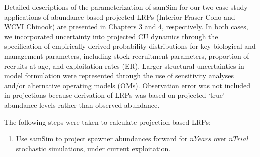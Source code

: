 \documentclass[11pt]{book}
\begin{document}
Detailed descriptions of the parameterization of samSim for our two case study applications of abundance-based projected LRPs (Interior Fraser Coho and WCVI Chinook) are presented in Chapters 3 and 4, respectively. In both cases, we incorporated uncertainty into projected CU dynamics through the specification of empirically-derived probability distributions for key biological and management parameters, including stock-recruitment parameters, proportion of recruits at age, and exploitation rates (ER). Larger structural uncertainties in model formulation were represented through the use of sensitivity analyses and/or alternative operating models (OMs). Observation error was not included in projections because derivation of LRPs was based on projected `true' abundance levels rather than observed abundance.

The following steps were taken to calculate projection-based LRPs:
\begin{enumerate}
\def\labelenumi{\arabic{enumi}.}

\item
  Use samSim to project spawner abundances forward for \(nYears\) over \(nTrial\) stochastic simulations, under current exploitation.
\end{enumerate}
\end{document}
